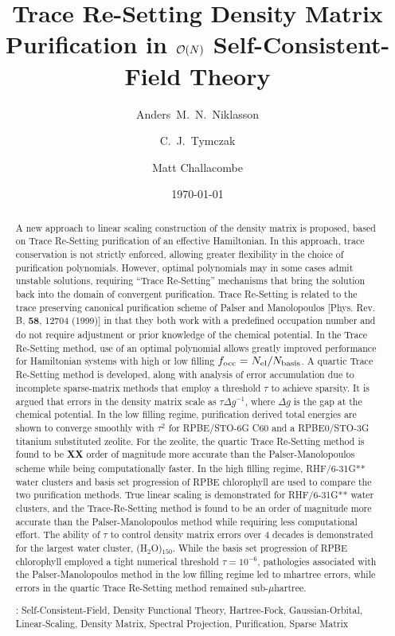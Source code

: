 \commentoutA{\documentclass[prb,aps,twocolumn,twocolumngrid,secnumarabic]{revtex4}}
\begin{document}
\date{\today}

\title{Trace Re-Setting Density Matrix Purification in ${\cal O}(N)$ Self-Consistent-Field Theory\footnotemark[4] }

\author{Anders~M.~N.~Niklasson\footnotemark[2]}
\author{C.~J.~Tymczak\footnotemark[3]}
\author{Matt Challacombe\footnotemark[6]}

\begin{abstract}
A new approach to linear scaling construction of the density matrix is proposed,
based on Trace Re-Setting purification of an effective Hamiltonian.  In this approach,
trace conservation is not strictly enforced, allowing greater flexibility in the
choice of purification polynomials.  However, optimal polynomials may in some cases 
admit unstable solutions, requiring ``Trace Re-Setting'' mechanisms that bring the 
solution back into the domain of convergent purification.  Trace Re-Setting is related 
to the trace preserving canonical purification scheme of Palser and Manolopoulos 
[Phys. Rev. B, {\bf 58}, 12704 (1999)] in that they both work with a predefined 
occupation number and do not require adjustment or prior knowledge of the chemical 
potential.  In the Trace Re-Setting method, use of an optimal polynomial allows greatly 
improved performance for Hamiltonian systems with high or low filling 
$f_{\rm occ}=N_{\rm el}/N_{\rm basis}$.  A quartic Trace Re-Setting method is developed, 
along with analysis of error accumulation due to incomplete sparse-matrix methods that 
employ a threshold $\tau$ to achieve sparsity.  It is argued that errors in the density matrix
scale as $\tau \Delta g^{-1}$, where $\Delta g$ is the gap at the chemical potential.  
In the low filling regime,  purification derived total energies are shown to converge 
smoothly with $\tau^2$ for RPBE/STO-6G C60 and a RPBE0/STO-3G titanium substituted zeolite.  
For the zeolite, the quartic Trace Re-Setting method is found to be {\bf XX} order of magnitude 
more accurate than the Palser-Manolopoulos scheme while being computationally faster.  
In the high filling regime, RHF/6-31G** water clusters and basis set progression of RPBE 
chlorophyll are used to compare the two purification methods. True linear scaling is demonstrated 
for RHF/6-31G**  water clusters, and the Trace-Re-Setting method is found to be an order of 
magnitude more accurate than the Palser-Manolopoulos method while requiring less computational 
effort.  The ability of $\tau$ to control density matrix errors over 4 decades is demonstrated 
for the largest water cluster, (H$_2$O)$_{150}$.  While the basis set progression of RPBE 
chlorophyll employed a tight numerical threshold $\tau=10^{-6}$, pathologies 
associated with the Palser-Manolopoulos method in the low filling regime led to mhartree errors, 
while errors in the quartic Trace Re-Setting method remained sub-$\mu$hartree.

\smallskip
{}: Self-Consistent-Field, Density Functional Theory, Hartree-Fock, Gaussian-Orbital, 
                         Linear-Scaling, Density Matrix, Spectral Projection, Purification, Sparse Matrix
\end{abstract}
\end{document}
